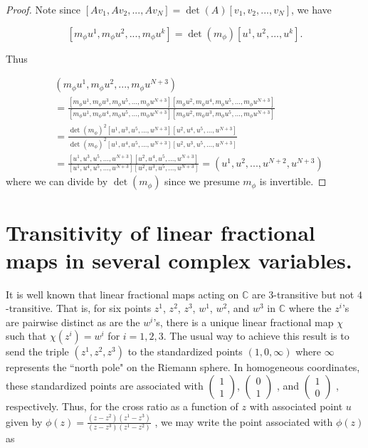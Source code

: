 \documentclass{amsart}
\theoremstyle{theorem}
\theoremstyle{lemma}
\theoremstyle{definition}
\begin{document}
\begin{proof}
Note since $[Av_1, Av_2,..., Av_N]=\det(A)[v_1, v_2,..., v_N]$, we have 

$$[m_{\phi}u^1, m_{\phi}u^2,..., m_{\phi}u^k]=\det (m_{\phi}) [u^1, u^2,..., u^k].$$

Thus 

\begin{align*}
&(m_{\phi}u^1,m_{\phi}u^2,...,m_{\phi}u^{N+3})\\
&=\frac{[m_{\phi}u^1, m_{\phi}u^3,m_{\phi}u^5,...,m_{\phi}u^{N+3}][m_{\phi}u^2,m_{\phi}u^4,m_{\phi}u^5,...,m_{\phi}u^{N+3}]}{[m_{\phi}u^1, m_{\phi}u^4,m_{\phi}u^5,...,m_{\phi}u^{N+3}][m_{\phi}u^2,m_{\phi}u^3,m_{\phi}u^5,...,m_{\phi}u^{N+3}]}\\
&=\frac{\det(m_{\phi})^2[u^1, u^3, u^5,...,u^{N+3}][u^2,u^4,u^5,...,u^{N+3}]}{\det(m_{\phi})^2[u^1, u^4,u^5,...,u^{N+3}][u^2,u^3,u^5,...,u^{N+3}]}\\
&=\frac{[u^1, u^3,u^5,...,u^{N+3}][u^2,u^4,u^5,...,u^{N+3}]}{[u^1, u^4,u^5,...,u^{N+3}][u^2,u^3,u^5,...,u^{N+3}]}=(u^1, u^2, ...,u^{N+2}, u^{N+3})
\end{align*}
where we can divide by $\det(m_{\phi})$ since we presume $m_{\phi}$ is invertible.
\end{proof}

\section{Transitivity of linear fractional maps in several complex variables.}

It is well known that linear fractional maps acting on $\mathbb{C}$ are $3$-transitive but not $4$-transitive. That is, for six points $z^1$, $z^2$, $z^3$, $w^1$, $w^2$, and $w^3$ in $\mathbb{C}$ where the $z^i$'s are pairwise distinct as are the $w^i$'s, there is a unique linear fractional map $\chi$ such that $\chi(z^i)=w^i$ for $i=1,2,3$. The usual way to achieve this result is to send the triple $(z^1, z^2, z^3)$ to the standardized points $(1,0, \infty)$ where $\infty$ represents the ``north pole" on the Riemann sphere. In homogeneous coordinates, these standardized points are associated with $\begin{pmatrix}1 \\ 1\end{pmatrix}$, $\begin{pmatrix}0 \\ 1\end{pmatrix}$ , and $\begin{pmatrix}1 \\ 0\end{pmatrix}$ , respectively. Thus, for the cross ratio as a function of $z$ with associated point $u$ given by $\phi(z)=\frac{(z-z^2)(z^1-z^3)}{(z-z^3)(z^1-z^2)}$ , we may write the point associated with $\phi (z)$ as 
\end{document}
